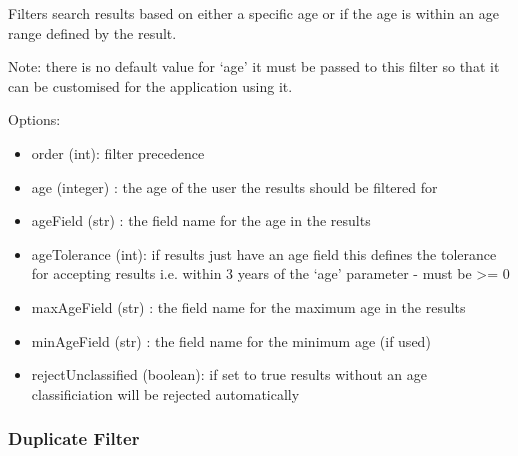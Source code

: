 \documentclass[letterpaper,10pt,english]{sphinxmanual}
\begin{document}
\begin{fulllineitems}
\label{api2.0:puppy.result.filter.AgeFilter}
Filters search results based on either a specific age or if the age is within an age range defined by the result.

Note: there is no default value for `age' it must be passed to this filter so that it can be customised for the application using it.

Options:
\begin{itemize}
\item {} 
order (int): filter precedence

\item {} 
age (integer) : the age of the user the results should be filtered for

\item {} 
ageField (str) : the field name for the age in the results

\item {} 
ageTolerance (int): if results just have an age field this defines the tolerance for accepting results i.e. within 3 years of the `age' parameter - must be \textgreater{}= 0

\item {} 
maxAgeField (str) : the field name for the maximum age in the results

\item {} 
minAgeField (str) : the field name for the minimum age (if used)

\item {} 
rejectUnclassified (boolean): if set to true results without an age classificiation will be rejected automatically

\end{itemize}

\end{fulllineitems}



\subsubsection{Duplicate Filter}
\label{api2.0:duplicate-filter}
\end{document}
